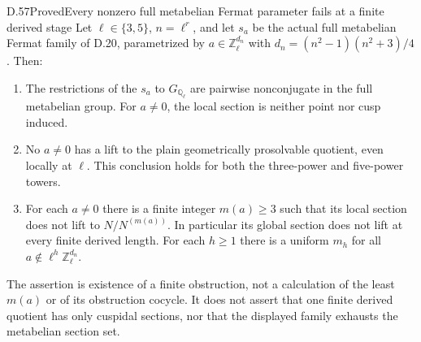 \begin{statement}{D.57}{Proved}{Every nonzero full metabelian Fermat parameter fails at a finite derived stage}
Let $\ell\in\{3,5\}$, $n=\ell^r$, and let
$s_a$ be the actual full metabelian Fermat family of D.20,
parametrized by $a\in\mathbb Z_\ell^{d_n}$ with
$d_n=(n^2-1)(n^2+3)/4$.  Then:
\begin{enumerate}
\item The restrictions of the $s_a$ to $G_{\mathbb Q_\ell}$
are pairwise nonconjugate in the full metabelian group.  For
$a\ne0$, the local section is neither point nor cusp induced.
\item No $a\ne0$ has a lift to the plain geometrically
prosolvable quotient, even locally at $\ell$.  This conclusion
holds for both the three-power and five-power towers.
\item For each $a\ne0$ there is a finite integer $m(a)\ge3$
such that its local section does not lift to $N/N^{(m(a))}$.
In particular its global section does not lift at every finite
derived length.  For each $h\ge1$ there is a uniform $m_h$ for
all $a\notin\ell^h\mathbb Z_\ell^{d_n}$.
\end{enumerate}
The assertion is existence of a finite obstruction, not a
calculation of the least $m(a)$ or of its obstruction cocycle.
It does not assert that one finite derived quotient has only
cuspidal sections, nor that the displayed family exhausts the
metabelian section set.

\end{statement}
